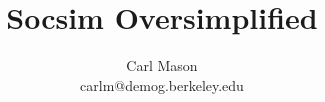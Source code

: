 \documentclass[11pt]{article}
\begin{document}
\pagestyle{myheadings}
\title{Socsim Oversimplified}
\author{Carl Mason\\
carlm@demog.berkeley.edu}
\maketitle
\tableofcontents









\end{document}
